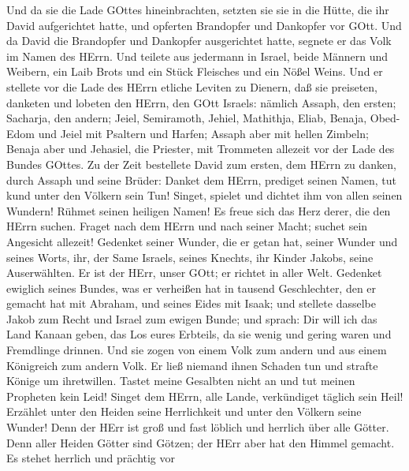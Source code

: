  Und da sie die Lade GOttes hineinbrachten, setzten sie sie
in die Hütte, die ihr David aufgerichtet hatte, und opferten Brandopfer
und Dankopfer vor GOtt.  Und da David die Brandopfer und
Dankopfer ausgerichtet hatte, segnete er das Volk im Namen des HErrn.
 Und teilete aus jedermann in Israel, beide Männern und
Weibern, ein Laib Brots und ein Stück Fleisches und ein Nößel Weins.
 Und er stellete vor die Lade des HErrn etliche Leviten zu
Dienern, daß sie preiseten, danketen und lobeten den HErrn, den GOtt
Israels:  nämlich Assaph, den ersten; Sacharja, den andern;
Jeiel, Semiramoth, Jehiel, Mathithja, Eliab, Benaja, Obed-Edom und Jeiel
mit Psaltern und Harfen; Assaph aber mit hellen Zimbeln; 
Benaja aber und Jehasiel, die Priester, mit Trommeten allezeit vor der
Lade des Bundes GOttes.  Zu der Zeit bestellete David zum
ersten, dem HErrn zu danken, durch Assaph und seine Brüder: 
Danket dem HErrn, prediget seinen Namen, tut kund unter den Völkern sein
Tun!  Singet, spielet und dichtet ihm von allen seinen
Wundern!  Rühmet seinen heiligen Namen! Es freue sich das
Herz derer, die den HErrn suchen.  Fraget nach dem HErrn
und nach seiner Macht; suchet sein Angesicht allezeit! 
Gedenket seiner Wunder, die er getan hat, seiner Wunder und seines
Worts,  ihr, der Same Israels, seines Knechts, ihr Kinder
Jakobs, seine Auserwählten.  Er ist der HErr, unser GOtt;
er richtet in aller Welt.  Gedenket ewiglich seines Bundes,
was er verheißen hat in tausend Geschlechter,  den er
gemacht hat mit Abraham, und seines Eides mit Isaak;  und
stellete dasselbe Jakob zum Recht und Israel zum ewigen Bunde;
 und sprach: Dir will ich das Land Kanaan geben, das Los
eures Erbteils,  da sie wenig und gering waren und
Fremdlinge drinnen.  Und sie zogen von einem Volk zum
andern und aus einem Königreich zum andern Volk.  Er ließ
niemand ihnen Schaden tun und strafte Könige um ihretwillen.
 Tastet meine Gesalbten nicht an und tut meinen Propheten
kein Leid!  Singet dem HErrn, alle Lande, verkündiget
täglich sein Heil!  Erzählet unter den Heiden seine
Herrlichkeit und unter den Völkern seine Wunder!  Denn der
HErr ist groß und fast löblich und herrlich über alle Götter.
 Denn aller Heiden Götter sind Götzen; der HErr aber hat
den Himmel gemacht.  Es stehet herrlich und prächtig vor
